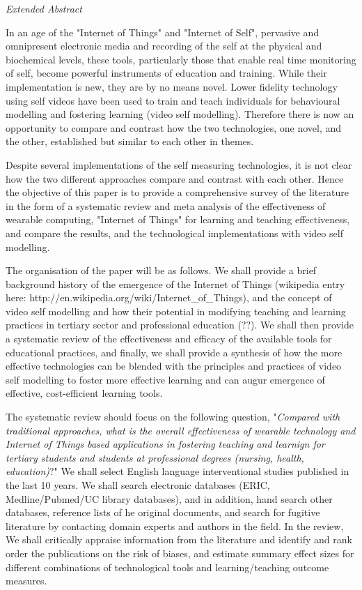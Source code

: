 \textit{Extended Abstract} 

In an age of the "Internet of Things" and "Internet of Self", pervasive and omnipresent electronic media and recording of the self at the physical and biochemical levels, these tools, particularly those that enable real time monitoring of self, become powerful instruments of education and training. While their implementation is new, they are by no means novel. Lower fidelity technology using self videos have been used to train and teach individuals for behavioural modelling and fostering learning (video self modelling). Therefore there is now an opportunity to compare and contrast how the two technologies, one novel, and the other, established but similar to each other in themes. 

Despite several implementations of the self measuring technologies, it is not clear how the two different approaches compare and contrast with each other. Hence the objective of this paper is to provide a comprehensive survey of the literature in the form of a systematic review and meta analysis of the effectiveness of wearable computing, "Internet of Things" for learning and teaching effectiveness, and compare the results, and the technological implementations with video self modelling. 

The organisation of the paper will be as follows. We shall provide a brief background history of the emergence of the Internet of Things (wikipedia entry here: http://en.wikipedia.org/wiki/Internet_of_Things), and the concept of video self modelling and how their potential in modifying teaching and learning practices in tertiary sector and professional education (??). We shall then provide a systematic review of the effectiveness and efficacy of the available tools for educational practices, and finally, we shall provide a synthesis of how the more effective technologies can be blended with the principles and practices of video self modelling to foster more effective learning and can augur emergence of effective, cost-efficient learning tools.

The systematic review should focus on the following question, "\textit{Compared with traditional approaches, what is the overall effectiveness of wearable technology and Internet of Things based applications in fostering teaching and learnign for tertiary students and students at professional degrees (nursing, health, education)}?" We shall select English language interventional studies published in the last 10 years. We shall search electronic databases (ERIC, Medline/Pubmed/UC library databases), and in addition,  hand search other databases, reference lists of he original documents, and search for fugitive literature by contacting domain experts and authors in the field. In the review, We shall critically appraise information from the literature and identify and rank order the publications on the risk of biases, and estimate summary effect sizes for different combinations of technological tools and learning/teaching outcome measures. 

